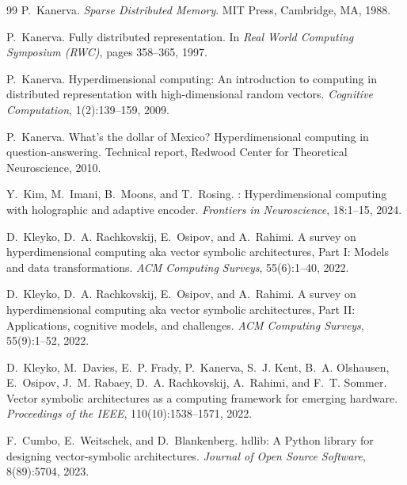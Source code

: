 \documentclass[twoside,11pt]{article}
\begin{document}
\begin{thebibliography}{99}
P.~Kanerva.
\newblock \textit{Sparse Distributed Memory}.
\newblock MIT Press, Cambridge, MA, 1988.

P.~Kanerva.
\newblock Fully distributed representation.
\newblock In \textit{Real World Computing Symposium (RWC)}, pages 358--365, 1997.

P.~Kanerva.
\newblock Hyperdimensional computing: An introduction to computing in distributed representation with high-dimensional random vectors.
\newblock \textit{Cognitive Computation}, 1(2):139--159, 2009.

P.~Kanerva.
\newblock What's the dollar of {M}exico? {H}yperdimensional computing in question-answering.
\newblock Technical report, Redwood Center for Theoretical Neuroscience, 2010.

Y.~Kim, M.~Imani, B.~Moons, and T.~Rosing.
: Hyperdimensional computing with holographic and adaptive encoder.
\newblock \textit{Frontiers in Neuroscience}, 18:1--15, 2024.

D.~Kleyko, D.~A. Rachkovskij, E.~Osipov, and A.~Rahimi.
\newblock A survey on hyperdimensional computing aka vector symbolic architectures, {P}art {I}: Models and data transformations.
\newblock \textit{ACM Computing Surveys}, 55(6):1--40, 2022.

D.~Kleyko, D.~A. Rachkovskij, E.~Osipov, and A.~Rahimi.
\newblock A survey on hyperdimensional computing aka vector symbolic architectures, {P}art {II}: Applications, cognitive models, and challenges.
\newblock \textit{ACM Computing Surveys}, 55(9):1--52, 2022.

D.~Kleyko, M.~Davies, E.~P. Frady, P.~Kanerva, S.~J. Kent, B.~A. Olshausen, E.~Osipov, J.~M. Rabaey, D.~A. Rachkovskij, A.~Rahimi, and F.~T. Sommer.
\newblock Vector symbolic architectures as a computing framework for emerging hardware.
\newblock \textit{Proceedings of the IEEE}, 110(10):1538--1571, 2022.

F.~Cumbo, E.~Weitschek, and D.~Blankenberg.
\newblock hdlib: A {P}ython library for designing vector-symbolic architectures.
\newblock \textit{Journal of Open Source Software}, 8(89):5704, 2023.


\end{thebibliography}
\end{document}
